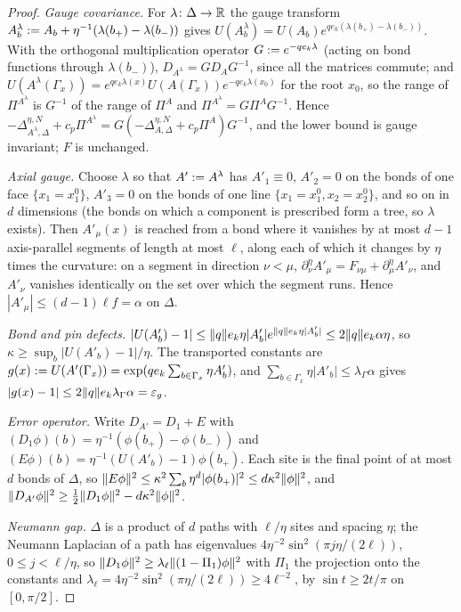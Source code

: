 \begin{proof}
\emph{Gauge covariance.} For $\lambda\colon\Delta\to\mathbb R$ the gauge transform $A^\lambda_b:= A_b+\eta^{-1}(\lambda(b_+)-\lambda(b_-))$ gives $U(A^\lambda_b)=U(A_b)e^{qe_k(\lambda(b_+)-\lambda(b_-))}$. With the orthogonal multiplication operator $G:= e^{-qe_k\lambda}$ (acting on bond functions through $\lambda(b_-)$), $D_{A^\lambda}=GD_AG^{-1}$, since all the matrices commute; and $U(A^\lambda(\Gamma_x))=e^{qe_k\lambda(x)}U(A(\Gamma_x))e^{-qe_k\lambda(x_0)}$ for the root $x_0$, so the range of $\Pi^{A^\lambda}$ is $G^{-1}$ of the range of $\Pi^A$ and $\Pi^{A^\lambda}=G\Pi^AG^{-1}$. Hence $-\Delta^{\eta,N}_{A^\lambda,\Delta}+c_p\Pi^{A^\lambda}=G(-\Delta^{\eta,N}_{A,\Delta}+c_p\Pi^A)G^{-1}$, and the lower bound is gauge invariant; $F$ is unchanged.

\emph{Axial gauge.} Choose $\lambda$ so that $A':= A^\lambda$ has $A'_1\equiv0$, $A'_2=0$ on the bonds of one face $\{x_1=x_1^0\}$, $A'_3=0$ on the bonds of one line $\{x_1=x_1^0,x_2=x_2^0\}$, and so on in $d$ dimensions (the bonds on which a component is prescribed form a tree, so $\lambda$ exists). Then $A'_\mu(x)$ is reached from a bond where it vanishes by at most $d-1$ axis-parallel segments of length at most $\ell$, along each of which it changes by $\eta$ times the curvature: on a segment in direction $\nu<\mu$, $\partial^\eta_\nu A'_\mu=F_{\nu\mu}+\partial^\eta_\mu A'_\nu$, and $A'_\nu$ vanishes identically on the set over which the segment runs. Hence $|A'_\mu|\le(d-1)\ell f=\alpha$ on $\Delta$.

\emph{Bond and pin defects.} $|U(A'_b)-1|\le\lVert q\rVert e_k\eta|A'_b|e^{\lVert q\rVert e_k\eta|A'_b|}\le2\lVert q\rVert e_k\alpha\eta$, so $\kappa\ge\sup_b|U(A'_b)-1|/\eta$. The transported constants are $g(x):= U(A'(\Gamma_x))=\exp(qe_k\sum_{b\in\Gamma_x}\eta A'_b)$, and $\sum_{b\in\Gamma_x}\eta|A'_b|\le\lambda_\Gamma\alpha$ gives $|g(x)-1|\le2\lVert q\rVert e_k\lambda_\Gamma\alpha=\varepsilon_g$.

\emph{Error operator.} Write $D_{A'}=D_1+E$ with $(D_1\phi)(b)=\eta^{-1}(\phi(b_+)-\phi(b_-))$ and $(E\phi)(b)=\eta^{-1}(U(A'_b)-1)\phi(b_+)$. Each site is the final point of at most $d$ bonds of $\Delta$, so $\lVert E\phi\rVert^2\le\kappa^2\sum_b\eta^d|\phi(b_+)|^2\le d\kappa^2\lVert \phi\rVert^2$, and $\lVert D_{A'}\phi\rVert^2\ge\frac12\lVert D_1\phi\rVert^2-d\kappa^2\lVert \phi\rVert^2$.

\emph{Neumann gap.} $\Delta$ is a product of $d$ paths with $\ell/\eta$ sites and spacing $\eta$; the Neumann Laplacian of a path has eigenvalues $4\eta^{-2}\sin^2(\pi j\eta/(2\ell))$, $0\le j<\ell/\eta$, so $\lVert D_1\phi\rVert^2\ge\lambda_\ell\lVert (1-\Pi_1)\phi\rVert^2$ with $\Pi_1$ the projection onto the constants and $\lambda_\ell=4\eta^{-2}\sin^2(\pi\eta/(2\ell))\ge4\ell^{-2}$, by $\sin t\ge2t/\pi$ on $[0,\pi/2]$.


\end{proof}
